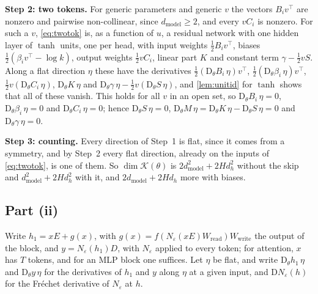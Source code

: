 \documentclass[10pt]{article}
\theoremstyle{definition}
\theoremstyle{remark}
\newcommand{\Wread}{W_{\mathrm{read}}}
\newcommand{\Wwrite}{W_{\mathrm{write}}}
\newcommand{\dm}{d_{\mathrm{model}}}
\newcommand{\Der}{\mathrm{D}}
\newcommand{\para}[1]{\smallskip\noindent\textbf{#1}\hspace{0.5em}}
\begin{document}
\para{Step 2: two tokens.} For generic parameters and generic $v$ the vectors $B_iv^\top$ are nonzero and pairwise non-collinear, since $\dm \ge 2$, and every $vC_i$ is nonzero. For such a $v$, \cref{eq:twotok} is, as a function of $u$, a residual network with one hidden layer of $\tanh$ units, one per head, with input weights $\tfrac12B_iv^\top$, biases $\tfrac12(\beta_iv^\top - \log k)$, output weights $\tfrac12vC_i$, linear part $K$ and constant term $\gamma - \tfrac12vS$. Along a flat direction $\eta$ these have the derivatives $\tfrac12(\Der_\theta B_i\,\eta)v^\top$, $\tfrac12(\Der_\theta\beta_i\,\eta)v^\top$, $\tfrac12v(\Der_\theta C_i\,\eta)$, $\Der_\theta K\,\eta$ and $\Der_\theta\gamma\,\eta - \tfrac12v(\Der_\theta S\,\eta)$, and \cref{lem:unitid} for $\tanh$ shows that all of these vanish. This holds for all $v$ in an open set, so $\Der_\theta B_i\,\eta = 0$, $\Der_\theta\beta_i\,\eta = 0$ and $\Der_\theta C_i\,\eta = 0$; hence $\Der_\theta S\,\eta = 0$, $\Der_\theta M\,\eta = \Der_\theta K\,\eta - \Der_\theta S\,\eta = 0$ and $\Der_\theta\gamma\,\eta = 0$.

\para{Step 3: counting.} Every direction of Step~1 is flat, since it comes from a symmetry, and by Step~2 every flat direction, already on the inputs of \cref{eq:twotok}, is one of them. So $\dim\mathcal K(\theta)$ is $2\dm^2 + 2Hd_h^2$ without the skip and $\dm^2 + 2Hd_h^2$ with it, and $2\dm + 2Hd_h$ more with biases.

\subsection*{Part (ii)}

Write $h_1 = xE + g(x)$, with $g(x) = f(N_\varepsilon(xE)\Wread)\Wwrite$ the output of the block, and $y = N_\varepsilon(h_1)D$, with $N_\varepsilon$ applied to every token; for attention, $x$ has $T$ tokens, and for an MLP block one suffices. Let $\eta$ be flat, and write $\Der_\theta h_1\,\eta$ and $\Der_\theta y\,\eta$ for the derivatives of $h_1$ and $y$ along $\eta$ at a given input, and $\Der N_\varepsilon(h)$ for the Fr\'echet derivative of $N_\varepsilon$ at $h$.
\end{document}
